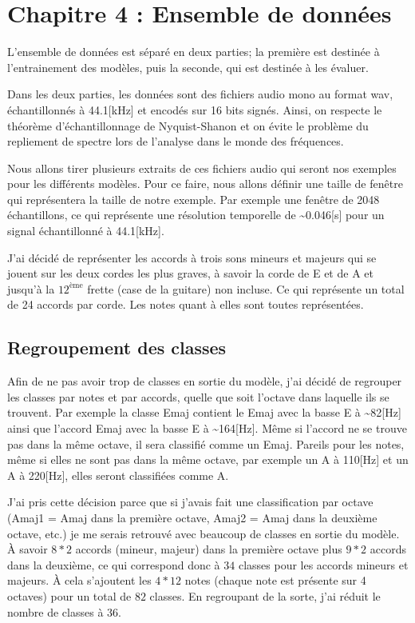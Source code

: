 \chapter{Chapitre 4 : Ensemble de données}
\label{chap:4}

L'ensemble de données est séparé en deux parties; la première est destinée à l'entrainement des modèles, puis la seconde, qui est destinée à les évaluer.

Dans les deux parties, les données sont des fichiers audio mono au format wav, échantillonnés à 44.1[kHz] et encodés sur 16 bits signés. Ainsi, on respecte le théorème d'échantillonnage de Nyquist-Shanon \parencite{noauthor_theoreme_2021} et on évite le problème du repliement de spectre lors de l'analyse dans le monde des fréquences.

Nous allons tirer plusieurs extraits de ces fichiers audio qui seront nos exemples pour les différents modèles. Pour ce faire, nous allons définir une taille de fenêtre qui représentera la taille de notre exemple. Par exemple une fenêtre de 2048 échantillons, ce qui représente une résolution temporelle de \textasciitilde0.046[s] pour un signal échantillonné à 44.1[kHz].

J'ai décidé de représenter les accords à trois sons mineurs et majeurs qui se jouent sur les deux cordes les plus graves, à savoir la corde de E et de A et jusqu'à la $12^\text{ème}$ frette (case de la guitare) non incluse. Ce qui représente un total de 24 accords par corde. Les notes quant à elles sont toutes représentées.

\section{Regroupement des classes}
\label{sec:4.1}

Afin de ne pas avoir trop de classes en sortie du modèle, j'ai décidé de regrouper les classes par notes et par accords, quelle que soit l'octave dans laquelle ils se trouvent. Par exemple la classe Emaj contient le Emaj avec la basse E à \textasciitilde82[Hz] ainsi que l'accord Emaj avec la basse E à \textasciitilde164[Hz]. Même si l'accord ne se trouve pas dans la même octave, il sera classifié comme un Emaj. Pareils pour les notes, même si elles ne sont pas dans la même octave, par exemple un A à 110[Hz] et un A à 220[Hz], elles seront classifiées comme A.

J'ai pris cette décision parce que si j'avais fait une classification par octave (Amaj1 = Amaj dans la première octave, Amaj2 = Amaj dans la deuxième octave, etc.) je me serais retrouvé avec beaucoup de classes en sortie du modèle. À savoir $8 * 2$ accords (mineur, majeur) dans la première octave plus $9 * 2$ accords dans la deuxième, ce qui correspond donc à $34$ classes pour les accords mineurs et majeurs. À cela s'ajoutent les $4 * 12$ notes (chaque note est présente sur 4 octaves) pour un total de $82$ classes. En regroupant de la sorte, j'ai réduit le nombre de classes à $36$.

